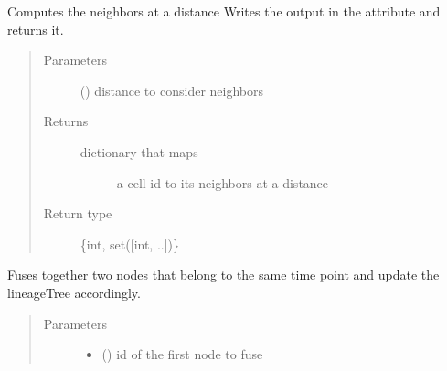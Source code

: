 \documentclass[letterpaper,10pt,english]{sphinxmanual}
\begin{document}
\begin{fulllineitems}
\begin{fulllineitems}
\end{fulllineitems}


\begin{fulllineitems}
\label{\detokenize{index:LineageTree.lineageTree.compute_spatial_edges}}
Computes the neighbors at a distance 
Writes the output in the attribute 
and returns it.
\begin{quote}\begin{description}
\item[{Parameters}] \leavevmode
{} () \textendash{} distance to consider neighbors

\item[{Returns}] \leavevmode
\begin{description}
\item[{dictionary that maps}] \leavevmode
a cell id to its neighbors at a distance 

\end{description}


\item[{Return type}] \leavevmode
\{int, set({[}int, ..{]})\}

\end{description}\end{quote}

\end{fulllineitems}


\begin{fulllineitems}
\label{\detokenize{index:LineageTree.lineageTree.fuse_nodes}}
Fuses together two nodes that belong to the same time point
and update the lineageTree accordingly.
\begin{quote}\begin{description}
\item[{Parameters}] \leavevmode\begin{itemize}
\item {} 
 () \textendash{} id of the first node to fuse


\end{itemize}
\end{description}
\end{quote}
\end{fulllineitems}
\end{fulllineitems}
\end{document}
